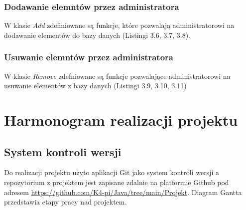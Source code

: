 \newpage


\subsection{Dodawanie elemntów przez administratora}
W klasie \textit{Add} zdefiniowane są funkcje, które pozwalają administratorowi na dodawanie elementów do bazy danych (Listingi 3.6, 3.7, 3.8).

\newpage 


\newpage
\subsection{Usuwanie elemntów przez administratora}
W klasie \textit{Remove} zdefniowane są funkcje pozwalające administratorowi na usuwanie elementów z bazy danych (Listingi 3.9, 3.10, 3.11)


\newpage 



\chapter{Harmonogram realizacji projektu}
\section{System kontroli wersji}
Do realizacji projektu użyto aplikacji Git jako system kontroli wersji 
a repozytorium z projektem jest zapisane zdalnie na platformie Github pod adresem
\url{https://github.com/K4-pi/Java/tree/main/Projekt}.
Diagram Gantta przedstawia etapy pracy nad projektem.

